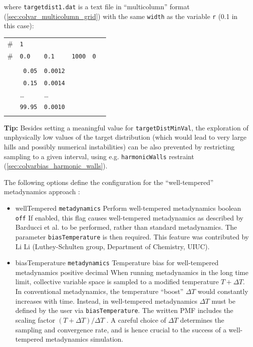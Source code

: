 \noindent{}where \texttt{targetdist1.dat} is a text file in ``multicolumn'' format (\ref{sec:colvar_multicolumn_grid}) with the same \texttt{width} as the variable \texttt{r} (0.1 in this case):\\
\begin{tabular}{l l l l l l}
\\
\# & \texttt{1} & & & & \\
\# & \texttt{0.0} & \texttt{0.1} & \texttt{1000} & \texttt{0} \\
\\
& \texttt{ 0.05} & \texttt{0.0012} \\
& \texttt{ 0.15} & \texttt{0.0014} \\
& \ldots & \ldots\\
& \texttt{99.95} &  \texttt{0.0010} \\
\\
\end{tabular}

\textbf{Tip:} Besides setting a meaningful value for \texttt{targetDistMinVal}, the exploration of unphysically low values of the target distribution (which would lead to very large hills and possibly numerical instabilities) can be also prevented by restricting sampling to a given interval, using e.g.{} \texttt{harmonicWalls} restraint (\ref{sec:colvarbias_harmonic_walls}).




The following options define the configuration for the ``well-tempered'' metadynamics approach \cite{Barducci2008}:

\begin{itemize}
\item %
  \keydef
    {wellTempered}{%
    \texttt{metadynamics}}{%
    Perform well-tempered metadynamics}{%
    boolean}{%
    \texttt{off}}{%
    If enabled, this flag causes well-tempered metadynamics as
    described by Barducci et al.\cite{Barducci2008}
    to be performed, rather than standard metadynamics.  The parameter
    \texttt{biasTemperature} is then required.
    This feature was contributed by Li Li (Luthey-Schulten group, Department of Chemistry, UIUC).}

\item %
  \key
    {biasTemperature}{%
    \texttt{metadynamics}}{%
    Temperature bias for well-tempered metadynamics}{%
    positive decimal}{%
    When running metadynamics in the long time limit, collective variable space is sampled to a modified
    temperature $T+\Delta T$.  In conventional metadynamics, the temperature ``boost'' $\Delta T$ would
    constantly increases with time.  Instead, in well-tempered metadynamics $\Delta T$ must be defined by the
    user via \texttt{biasTemperature}.  The written PMF includes the
    scaling factor $(T+\Delta T)/\Delta T$ \cite{Barducci2008}.  A careful choice of $\Delta T$ determines the
    sampling and convergence rate, and is hence crucial to the success of a well-tempered metadynamics
    simulation.}
\end{itemize}


